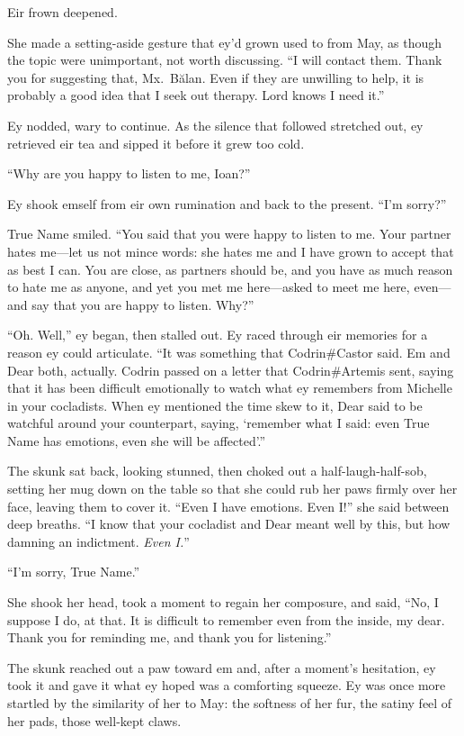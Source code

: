Eir frown deepened.

She made a setting-aside gesture that ey'd grown used to from May, as though the topic were unimportant, not worth discussing. ``I will contact them. Thank you for suggesting that, Mx.~Bălan. Even if they are unwilling to help, it is probably a good idea that I seek out therapy. Lord knows I need it.''

Ey nodded, wary to continue. As the silence that followed stretched out, ey retrieved eir tea and sipped it before it grew too cold.

``Why are you happy to listen to me, Ioan?''

Ey shook emself from eir own rumination and back to the present. ``I'm sorry?''

True Name smiled. ``You said that you were happy to listen to me. Your partner hates me—let us not mince words: she hates me and I have grown to accept that as best I can. You are close, as partners should be, and you have as much reason to hate me as anyone, and yet you met me here—asked to meet me here, even—and say that you are happy to listen. Why?''

``Oh. Well,'' ey began, then stalled out. Ey raced through eir memories for a reason ey could articulate. ``It was something that Codrin\#Castor said. Em and Dear both, actually. Codrin passed on a letter that Codrin\#Artemis sent, saying that it has been difficult emotionally to watch what ey remembers from Michelle in your cocladists. When ey mentioned the time skew to it, Dear said to be watchful around your counterpart, saying, `remember what I said: even True Name has emotions, even she will be affected'.''

The skunk sat back, looking stunned, then choked out a half-laugh-half-sob, setting her mug down on the table so that she could rub her paws firmly over her face, leaving them to cover it. ``Even I have emotions. Even I!'' she said between deep breaths. ``I know that your cocladist and Dear meant well by this, but how damning an indictment. \emph{Even I.}''

``I'm sorry, True Name.''

She shook her head, took a moment to regain her composure, and said, ``No, I suppose I do, at that. It is difficult to remember even from the inside, my dear. Thank you for reminding me, and thank you for listening.''

The skunk reached out a paw toward em and, after a moment's hesitation, ey took it and gave it what ey hoped was a comforting squeeze. Ey was once more startled by the similarity of her to May: the softness of her fur, the satiny feel of her pads, those well-kept claws.

